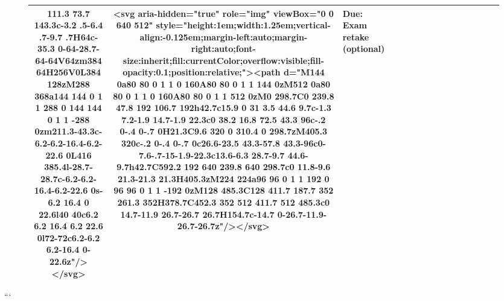 \documentclass[
]{article}
\begin{document}
\begin{figure*}
\begin{longtable*}{cclllccccccccccl}
111.3 73.7 143.3c-3.2 .5-6.4 .7-9.7 .7H64c-35.3 0-64-28.7-64-64V64zm384 64H256V0L384 128zM288 368a144 144 0 1 1 288 0 144 144 0 1 1 -288 0zm211.3-43.3c-6.2-6.2-16.4-6.2-22.6 0L416 385.4l-28.7-28.7c-6.2-6.2-16.4-6.2-22.6 0s-6.2 16.4 0 22.6l40 40c6.2 6.2 16.4 6.2 22.6 0l72-72c6.2-6.2 6.2-16.4 0-22.6z"/></svg> & <svg aria-hidden="true" role="img" viewBox="0 0 640 512" style="height:1em;width:1.25em;vertical-align:-0.125em;margin-left:auto;margin-right:auto;font-size:inherit;fill:currentColor;overflow:visible;fill-opacity:0.1;position:relative;"><path d="M144 0a80 80 0 1 1 0 160A80 80 0 1 1 144 0zM512 0a80 80 0 1 1 0 160A80 80 0 1 1 512 0zM0 298.7C0 239.8 47.8 192 106.7 192h42.7c15.9 0 31 3.5 44.6 9.7c-1.3 7.2-1.9 14.7-1.9 22.3c0 38.2 16.8 72.5 43.3 96c-.2 0-.4 0-.7 0H21.3C9.6 320 0 310.4 0 298.7zM405.3 320c-.2 0-.4 0-.7 0c26.6-23.5 43.3-57.8 43.3-96c0-7.6-.7-15-1.9-22.3c13.6-6.3 28.7-9.7 44.6-9.7h42.7C592.2 192 640 239.8 640 298.7c0 11.8-9.6 21.3-21.3 21.3H405.3zM224 224a96 96 0 1 1 192 0 96 96 0 1 1 -192 0zM128 485.3C128 411.7 187.7 352 261.3 352H378.7C452.3 352 512 411.7 512 485.3c0 14.7-11.9 26.7-26.7 26.7H154.7c-14.7 0-26.7-11.9-26.7-26.7z"/></svg> & Due: Exam retake (optional) \\ 
\bottomrule
\end{longtable*}

\end{figure*}

```
\end{document}
